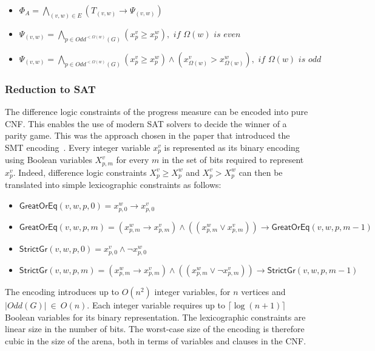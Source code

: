 \documentclass{article}
\begin{document}
\begin{itemize}
\item $\Phi_A = \bigwedge_{(v,w) \in E} \left(T_{(v,w)} \rightarrow \Psi_{(v,w)}\right)$
\item $\Psi_{(v,w)} = \bigwedge_{p \in \textit{Odd}^{<\Omega(w)}(G)} (x_p^v \geqslant x_p^w), \textit{ if } \Omega(w) \textit{ is even}$
\item $\Psi_{(v,w)} = \bigwedge_{p \in \textit{Odd}^{<\Omega(w)}(G)} (x_p^v \geqslant x_p^w) \land 
(x_{\Omega(w)}^v > x_{\Omega(w)}^w), \textit{ if } \Omega(w) \textit{ is odd}$
\end{itemize}

\subsubsection*{Reduction to SAT}

The difference logic constraints of the progress measure can be encoded into pure CNF. This enables the use of modern SAT solvers to decide the winner of a parity game. This was the approach chosen in the paper that introduced the SMT encoding~\cite{Heljanko:2012}. Every integer variable $x_p^v$ is represented as its binary encoding using Boolean variables $X_{p,m}^v$ for every $m$ in the set of bits required to represent $x_p^v$.  Indeed, difference logic constraints $X_p^v \geqslant X_p^w$ and $X_p^v > X_p^w$ can then be translated into simple lexicographic constraints as follows:

\begin{itemize}
    \item $\mathsf{GreatOrEq}(v, w, p, 0) = x_{p,0}^w \rightarrow x_{p,0}^v$
    \item $\mathsf{GreatOrEq}(v, w, p, m) = (x_{p,m}^w \rightarrow x_{p,m}^v) \wedge ((x_{p,m}^w \vee x_{p,m}^v)) \rightarrow \mathsf{GreatOrEq}(v, w, p, m-1)$
    \item $\mathsf{StrictGr}(v, w, p, 0) = x_{p,0}^v \wedge \neg x_{p,0}^w$
    \item $\mathsf{StrictGr}(v, w, p, m) = (x_{p,m}^w \rightarrow x_{p,m}^v) \wedge ((x_{p,m}^w \vee \neg x_{p,m}^v)) \rightarrow \mathsf{StrictGr}(v, w, p, m-1)$\end{itemize}

The encoding introduces up to $O(n^2)$ integer variables, for $n$ vertices and $|\textit{Odd}(G)|\ \in\ O(n)$. Each integer variable requires up to $\lceil \log(n+1) \rceil$ Boolean variables for its binary representation. The lexicographic constraints are linear size in the number of bits. The worst-case size of the encoding is therefore cubic in the size of the arena, both in terms of variables and clauses in the CNF.
\end{document}
